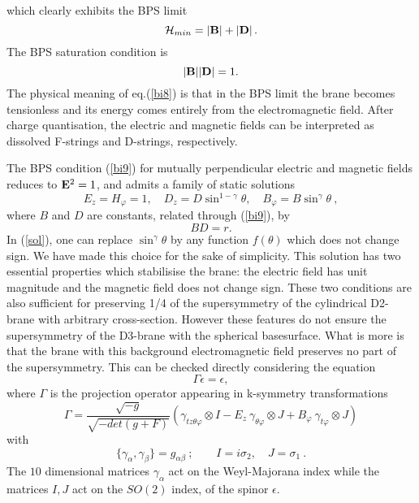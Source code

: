 \documentclass[a4paper,12pt]{article}
\begin{document}
which clearly exhibits the BPS limit
\begin{equation}
{\cal H}_{min}= |{\bf B} |+|{\bf D} |\, .
\label{bi8}
\end{equation}
The BPS saturation condition is
\begin{equation}
|{\bf B} ||{\bf D} |=1.
\label{bi9}
\end{equation}
The physical meaning of eq.(\ref{bi8})  is that in the BPS limit the brane becomes tensionless and its energy comes entirely  from the electromagnetic field. After charge quantisation, the electric and magnetic fields can be interpreted as dissolved  F-strings and D-strings, respectively.

The BPS condition (\ref{bi9}) for mutually perpendicular electric and magnetic fields reduces to ${\bf E}^2 =1$, and admits a family of static solutions 
\begin{equation}
E_z=H_{\varphi} =1,\quad D_z=D\sin^{1-\gamma}\theta ,\quad 
B_{\varphi}=B\sin^{\gamma}\theta \ ,
\label{sol}
\end{equation}
where $B$ and $D$ are constants, related through (\ref{bi9}), by
\begin{equation}
BD=r.
\label{bps}
\end{equation}
In (\ref{sol}), one can replace $\sin^{\gamma}\theta$ by any function $f(\theta)$ which does not change sign. We have made this choice for the sake of simplicity. This solution has two essential properties which stabilisise the brane: the electric field has unit magnitude and the magnetic field does not change sign. These two conditions are also sufficient for preserving 1/4 of the supersymmetry of the cylindrical D2-brane with arbitrary cross-section\cite{bak1, surp}. However these features do not ensure the supersymmetry of the D3-brane with the spherical basesurface. What is more is that the brane with this background electromagnetic field preserves no part of the supersymmetry. This can be checked directly considering the equation 
\begin{equation}
\Gamma\epsilon =\epsilon,
\label{k}
\end{equation}
where $\Gamma$ is the projection operator appearing in k-symmetry transformations \cite{ced, bk}
\begin{equation}
\Gamma=
\frac{\sqrt{-g}}{\sqrt{-det(g+F)}}(\gamma_{tz\theta\varphi}\otimes I - 
E_z\ \gamma_{\theta\varphi}\otimes J +
B_{\varphi}\ \gamma_{t\varphi}\otimes J)
\label{g}
\end{equation}
with
\begin{equation}
\{\gamma_{\alpha},\gamma_{\beta}\}=g_{\alpha\beta}\ ;\qquad
I=i\sigma_2,\quad J=\sigma_1\ .
\label{ij}
\end{equation}
The $10$ dimensional matrices $\gamma_{\alpha}$ act on the Weyl-Majorana index while the matrices $I,J$ act on the $SO(2)$ index, of the spinor $\epsilon$.
\end{document}
